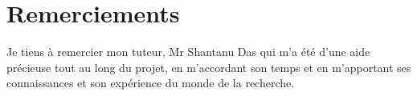 \section*{Remerciements}

Je tiens à remercier mon tuteur, Mr Shantanu Das qui m'a été d'une aide
précieuse tout au long du projet, en m'accordant son temps et en m'apportant
ses connaissances et son expérience du monde de la recherche.
